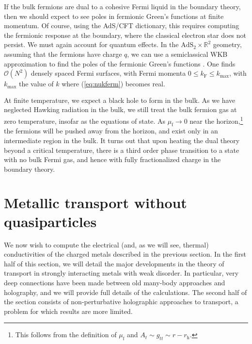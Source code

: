 \documentclass[10pt, oneside]{book}
\begin{document}
\begin{doublespace}

If the bulk fermions are dual to a cohesive Fermi liquid in the boundary theory, then we should expect to see poles in fermionic Green's functions at finite momentum.   Of course, using the AdS/CFT dictionary, this requires computing the fermionic response at the boundary, where the classical electron star does not persist.   We must again account for quantum effects.    In the $\mathrm{AdS}_2 \times \mathbb{R}^2$ geometry, assuming that the fermions have charge $q$, we can use a semiclassical WKB approximation to find the poles of the fermionic Green's functions \cite{Hartnoll:2011dm, Iqbal:2011in}.   One finds $\mathcal{O}(N^2)$ densely spaced Fermi surfaces, with Fermi momenta $0 \le k_{\mathrm{F}} \le k_{\mathrm{max}}$,  with $k_{\mathrm{max}}$ the value of $k$ where (\ref{eq:nukferm}) becomes real.

At finite temperature, we expect a black hole to form in the bulk.   As we have neglected Hawking radiation in the bulk,  we still treat the bulk fermion gas at zero temperature, insofar as the equations of state.    As $\mu_{\mathrm{f}} \rightarrow 0$ near the horizon,\footnote{This follows from the definition of $\mu_{\mathrm{f}}$ and $A_t \sim g_{tt} \sim r-r_{\mathrm{h}}$.}   the fermions will be pushed away from the horizon, and exist only in an intermediate region in the bulk.   It turns out that upon heating the dual theory beyond a critical temperature, there is a third order phase transition to a state with no bulk Fermi gas, and hence with fully fractionalized charge in the boundary theory.

\section{Metallic transport without quasiparticles}
\label{sec5}

We now wish  to compute the electrical (and, as we will see, thermal) conductivities of the charged metals described in the previous section.    In the first half of this section, we will detail the major developments in the theory of transport in strongly interacting metals with weak disorder.   In particular, very deep connections have been made between old many-body approaches and holography, and we will provide full details of the calculations.    The second half of the section consists of non-perturbative holographic approaches to transport, a problem for which results are more limited.


\end{doublespace}
\end{document}

